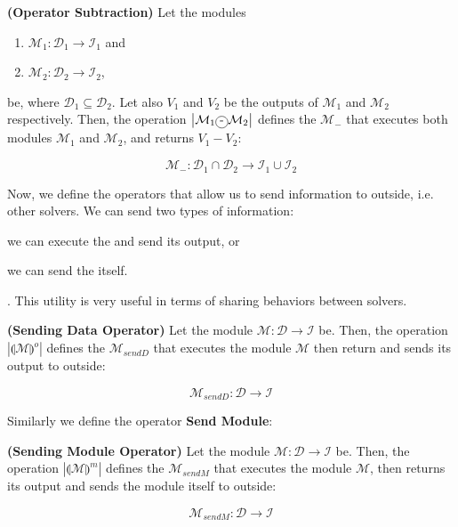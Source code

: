 \begin{definition}\label{op:subst}
{\bf (Operator Subtraction)} Let the modules
\begin{enumerate}%
	\item $\mathcal{M}_1 : \mathcal{D}_1 \rightarrow \mathcal{I}_1$ and  
	\item $\mathcal{M}_2 : \mathcal{D}_2 \rightarrow \mathcal{I}_2$,
\end{enumerate}%
be, where $\mathcal{D}_1 \subseteq \mathcal{D}_2$. %
Let also $V_1$ and $V_2$ be the outputs of $\mathcal{M}_1$ and $\mathcal{M}_2$ respectively. Then, the operation $\left|\mathcal{M}_1\circled{-}\mathcal{M}_2\right|$ defines the \cm{} $\mathcal{M}_{-}$ that executes both modules $\mathcal{M}_1$ and $\mathcal{M}_2$, and returns $V_1 - V_2$:

\[
\mathcal{M}_{-}:\mathcal{D}_1\cap\mathcal{D}_2 \rightarrow \mathcal{I}_1 \cup \mathcal{I}_2
\]
\end{definition}

Now, we define the operators that allow us to send information to outside, i.e. other solvers. We can send two types of information: 
\begin{inparaenum}[i)]
	\item we can execute the \om{} and send its output, or 
	\item we can send the \om{} itself.
\end{inparaenum}. This utility is very useful in terms of sharing behaviors between solvers.

\begin{definition}\label{op:osend}
{\bf (Sending Data Operator)} Let the module $\mathcal{M} : \mathcal{D} \rightarrow \mathcal{I}$ be. Then, the operation $\left|\llparenthesis \mathcal{M}\rrparenthesis^{o}\right|$ defines the \cm{} $\mathcal{M}_{sendD}$ that executes the module $\mathcal{M}$ then return and sends its output to outside:

\[
\mathcal{M}_{sendD}:\mathcal{D} \rightarrow \mathcal{I}
\]
\end{definition}

Similarly we define the operator \textbf{Send Module}:

\begin{definition}\label{op:msend}
{\bf (Sending Module Operator)} Let the module $\mathcal{M} : \mathcal{D} \rightarrow \mathcal{I}$ be. Then, the operation $\left|\llparenthesis \mathcal{M}\rrparenthesis^{m}\right|$ defines the \cm{} $\mathcal{M}_{sendM}$ that executes the module $\mathcal{M}$, then returns its output and sends the module itself to outside:

\[
\mathcal{M}_{sendM}:\mathcal{D} \rightarrow \mathcal{I}
\]
\end{definition}


